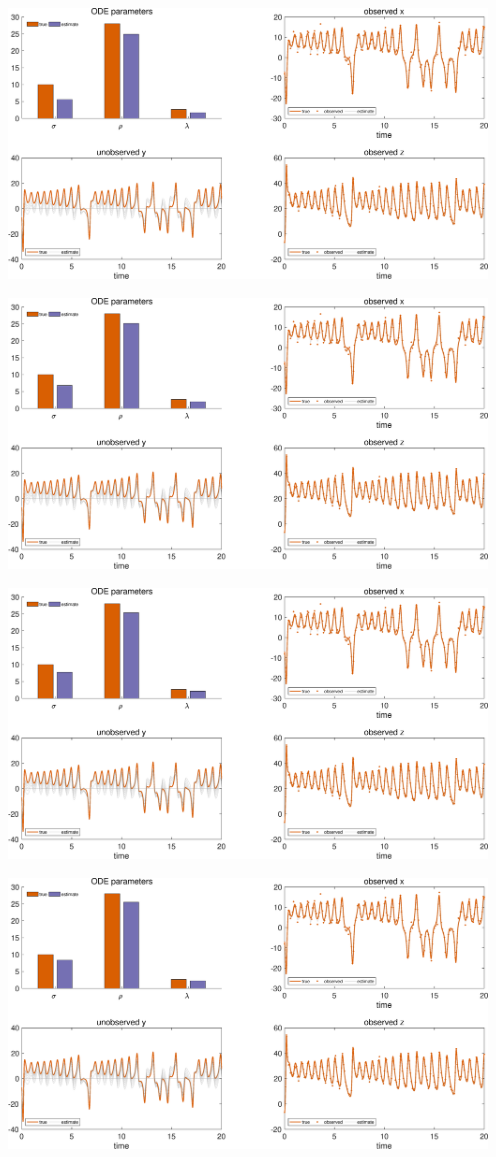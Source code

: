 {\includegraphics [width=5in]{VGM_for_Lorenz_Attractor_06.eps}

\includegraphics [width=5in]{VGM_for_Lorenz_Attractor_07.eps}

\includegraphics [width=5in]{VGM_for_Lorenz_Attractor_08.eps}

\includegraphics [width=5in]{VGM_for_Lorenz_Attractor_09.eps}

}

